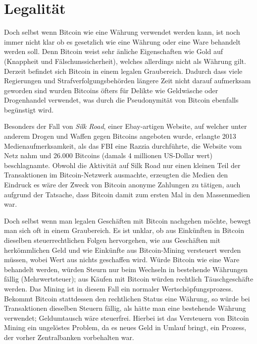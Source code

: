 \section{Legalität}

Doch selbst wenn Bitcoin wie eine Währung verwendet werden kann, ist noch immer nicht klar ob es gesetzlich wie eine Währung oder eine Ware behandelt werden soll.
Denn Bitcoin weist sehr änliche Eigenschaften wie Gold auf (Knappheit und Fälschunssicherheit), welches allerdings nicht als Währung gilt.
Derzeit befindet sich Bitcoin in einem legalen Graubereich.
Dadurch dass viele Regierungen und Strafverfolgungsbehörden längere Zeit nicht darauf aufmerksam geworden sind wurden Bitcoins öfters für Delikte wie Geldwäsche  oder Drogenhandel  verwendet, was durch die Pseudonymität von Bitcoin ebenfalls begünstigt wird.

Besonders der Fall von \emph{Silk Road}, einer Ebay-artigen Website, auf welcher unter anderem Drogen und Waffen gegen Bitcoins angeboten wurde, erlangte 2013 Medienaufmerksamkeit, als das FBI eine Razzia durchführte, die Website vom Netz nahm und 26.000 Bitcoins (damals 4 millionen US-Dollar wert) beschlagnamte.
Obwohl die Aktivität auf Silk Road nur einen kleinen Teil der Transaktionen im Bitcoin-Netzwerk ausmachte, erzeugten die Medien den Eindruck es wäre der Zweck von Bitcoin anonyme Zahlungen zu tätigen, auch aufgrund der Tatsache, dass Bitcoin damit zum ersten Mal in den Massenmedien war.

Doch selbst wenn man legalen Geschäften mit Bitcoin nachgehen möchte, bewegt man sich oft in einem Graubereich.
Es ist unklar, ob aus Einkünften in Bitcoin dieselben steuerrechtlichen Folgen hervorgehen, wie aus Geschäften mit herkömmlichen Geld und wie Einkünfte aus Bitcoin-Mining versteuert werden müssen, wobei Wert aus nichts geschaffen wird.
Würde Bitcoin wie eine Ware behandelt werden, würden Steurn nur beim Wechseln in bestehende Währungen fällig (Mehrwertsteuer); aus Käufen mit Bitcoin würden rechtlich Täuschgeschäfte werden.
Das Mining ist in diesem Fall ein normaler Wertschöpfungsprozess.
Bekommt Bitcoin stattdessen den rechtlichen Status eine Währung, so würde bei Transaktionen dieselben Steuern fällig, als hätte man eine bestehende Währung verwendet; Geldumtausch wäre steuerfrei.
Hierbei ist das Versteuern von Bitcoin Mining ein ungelöstes Problem, da es neues Geld in Umlauf bringt, ein Prozess, der vorher Zentralbanken vorbehalten war.
